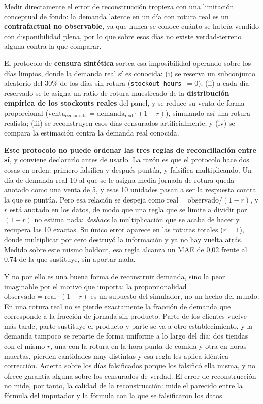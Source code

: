 Medir directamente el error de reconstrucción tropieza con una limitación conceptual de fondo: la demanda latente en un día con rotura real es un \textbf{contrafactual no observable}, ya que nunca se conoce cuánto se habría vendido con disponibilidad plena, por lo que sobre esos días no existe verdad-terreno alguna contra la que comparar.

El protocolo de \textbf{censura sintética} sortea esa imposibilidad operando sobre los días limpios, donde la demanda real sí es conocida: (i) se reserva un subconjunto aleatorio del 30\% de los días sin rotura (\texttt{stockout\_hours}~$=0$); (ii) a cada día reservado se le asigna un ratio de rotura muestreado de la \textbf{distribución empírica de los stockouts reales} del panel, y se reduce su venta de forma proporcional ($\text{venta}_{\text{censurada}} = \text{demanda}_{\text{real}}\cdot(1-r)$), simulando así una rotura realista; (iii) se reconstruyen esos días censurados artificialmente; y (iv) se compara la estimación contra la demanda real conocida.

\textbf{Este protocolo no puede ordenar las tres reglas de reconciliación entre sí}, y conviene declararlo antes de usarlo. La razón es que el protocolo hace dos cosas en orden: primero falsifica y después puntúa, y falsifica multiplicando. Un día de demanda real 10 al que se le asigna media jornada de rotura queda anotado como una venta de 5, y esas 10 unidades pasan a ser la respuesta contra la que se puntúa. Pero esa relación se despeja como $\text{real} = \text{observado}/(1-r)$, y $r$ está anotado en los datos, de modo que una regla que se limite a dividir por $(1-r)$ no estima nada: \emph{deshace} la multiplicación que se acaba de hacer y recupera las 10 exactas. Su único error aparece en las roturas totales ($r=1$), donde multiplicar por cero destruyó la información y ya no hay vuelta atrás. Medido sobre este mismo holdout, esa regla alcanza un MAE de 0,02 frente al 0,74 de la que sustituye, sin aportar nada.

Y no por ello es una buena forma de reconstruir demanda, sino la peor imaginable por el motivo que importa: la proporcionalidad $\text{observado} = \text{real}\cdot(1-r)$ es un supuesto del simulador, no un hecho del mundo. En una rotura real no se pierde exactamente la fracción de demanda que corresponde a la fracción de jornada sin producto. Parte de los clientes vuelve más tarde, parte sustituye el producto y parte se va a otro establecimiento, y la demanda tampoco se reparte de forma uniforme a lo largo del día: dos tiendas con el mismo $r$, una con la rotura en la hora punta de comida y otra en horas muertas, pierden cantidades muy distintas y esa regla les aplica idéntica corrección. Acierta sobre los días falsificados porque los falsificó ella misma, y no ofrece garantía alguna sobre los censurados de verdad. El error de reconstrucción no mide, por tanto, la calidad de la reconstrucción: mide el parecido entre la fórmula del imputador y la fórmula con la que se falsificaron los datos.


